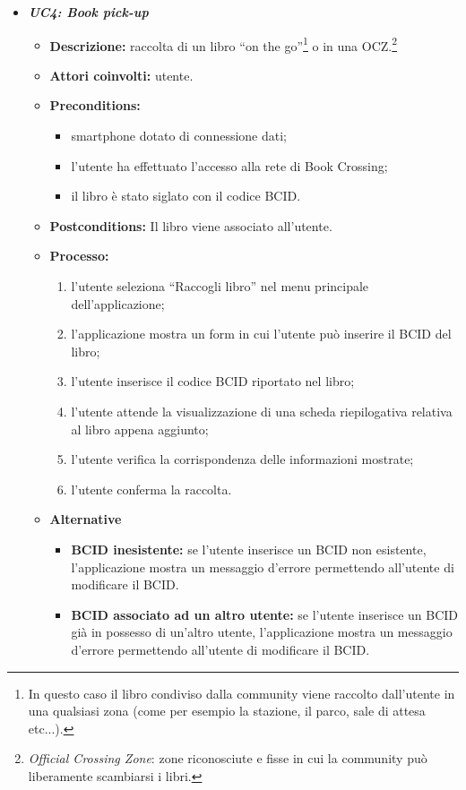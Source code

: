 \begin{itemize}
	\item \textit{\textbf{UC4: Book pick-up}}
	\begin{itemize}
		\item \textbf{Descrizione:} raccolta di un libro “on the go”\footnote{In questo caso il libro condiviso dalla community viene raccolto dall'utente in una qualsiasi zona (come per esempio la stazione, il parco, sale di attesa etc...).} o in una OCZ.\footnote{\textit{Official Crossing Zone}: zone riconosciute e fisse in cui la community può liberamente scambiarsi i libri.}
		\item \textbf{Attori coinvolti:} utente.
		\item \textbf{Preconditions:}
		\begin{itemize}
			\item smartphone dotato di connessione dati;
			\item l’utente ha effettuato l’accesso alla rete di Book Crossing;
			\item il libro è stato siglato con il codice BCID.
		\end{itemize}
		\item \textbf{Postconditions:} Il libro viene associato all’utente.
		\item \textbf{Processo:}
		\begin{enumerate}
			\item l’utente seleziona “Raccogli libro” nel menu principale dell’applicazione;
			\item l’applicazione mostra un form in cui l’utente può inserire il BCID del libro;
			\item l’utente inserisce il codice BCID riportato nel libro;
			\item l'utente attende la visualizzazione di una scheda riepilogativa relativa al libro appena aggiunto;
			\item l’utente verifica la corrispondenza delle informazioni mostrate;
			\item l'utente conferma la raccolta.
		\end{enumerate}
		\item \textbf{Alternative}
		\begin{itemize}
			\item \textbf{BCID inesistente:} se l'utente inserisce un BCID non esistente, l'applicazione mostra un messaggio d'errore permettendo all'utente di modificare il BCID.
			\item \textbf{BCID associato ad un altro utente:} se l'utente inserisce un BCID già in possesso di un'altro utente, l'applicazione mostra un messaggio d'errore permettendo all'utente di modificare il BCID.

\end{itemize}
\end{itemize}
\end{itemize}

